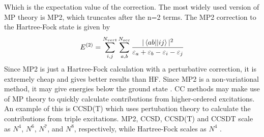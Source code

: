 \documentclass[letterpaper, 12pt, titlepage]{article}
\begin{document}
Which is the expectation value of the correction.  The most widely used version of MP theory is MP2, which truncates after the n=2 terms. The MP2 correction to the Hartree-Fock state is given by 
\begin{align*}
E^{(2)} = \sum\limits_{i,j}^{N_{vert}} \sum\limits_{a,b}^{N_{occ}} \frac{|\braket{ab||ij}|^2}{\varepsilon_a + \varepsilon_b -\varepsilon_i-\varepsilon_j}
\end{align*} 
Since MP2 is just a Hartree-Fock calculation with a perturbative correction, it is extremely cheap and gives better results than HF. Since MP2 is a non-variational method, it may give energies below the ground state \cite{SO}. CC methods may make use of MP theory to quickly calculate contributions from higher-ordered excitations. An example of this is CCSD(T) which uses pertubation theory to calculate the contributions from triple excitations. MP2, CCSD, CCSD(T) and CCSDT scale as $N^4$, $N^6$, $N^7$, and $N^8$, respectively, while Hartree-Fock scales as $N^4$ \cite{nooijen}.
\end{document}

